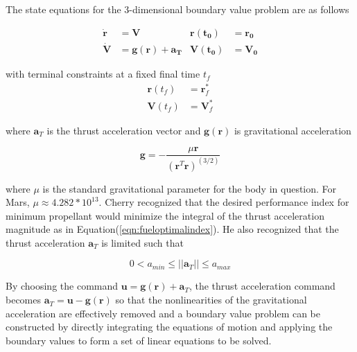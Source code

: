 The state equations for the 3-dimensional boundary value problem are as follows

\begin{align}
\label{eqn:EoM1}
\bm{\dot{r}} &= \bm{V}                               & \bm{r(t_0)} &= \bm{r_0}\\
\label{eqn:EoM2}
\bm{\dot{V}} &= \bm{g(r)} + \bm{a_T}                           & \bm{V(t_0)} &= \bm{V_0}
\end{align}


with terminal constraints at a fixed final time $t_f$
\begin{align}
\label{eqn:constraint_r}
\bm{r}(t_f) &= \bm{r}^*_f\\
\label{eqn:constraint_V}
\bm{V}(t_f) &= \bm{V}^*_f 
\end{align}

where $\bm{a}_T$ is the thrust acceleration vector and $\bm{g}(\bm{r})$ is gravitational acceleration

\begin{equation}
\label{eqn:gravity}
\bm{g} = -\frac{\mu \bm{r}}{(\bm{r}^T\bm{r})^{(3/2)}}
\end{equation}

where $\mu$ is the standard gravitational parameter for the body in question. For Mars, $\mu \approx 4.282*10^{13}$. Cherry recognized that the desired performance index for minimum propellant would minimize the integral of the thrust acceleration magnitude as in Equation\:(\ref{eqn:fueloptimalindex}). He also recognized that the thrust acceleration $\bm{a}_T$ is limited such that

\begin{equation} 
\label{eqn:thrustlimit}
0 < a_{min} \leq ||\bm{a}_T|| \leq a_{max}
\end{equation}

By choosing the command $\bm{u} = \bm{g(r)} + \bm{a}_T$, the thrust acceleration command becomes $\bm{a}_T = \bm{u} - \bm{g(r)}$ so that the nonlinearities of the gravitational acceleration are effectively removed and a boundary value problem can be constructed by directly integrating the equations of motion and applying the boundary values to form a set of linear equations to be solved.


